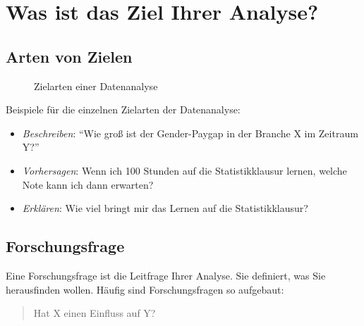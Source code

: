 \documentclass[
  a4paper,
  DIV=11]{scrreprt}
\providecommand{\tightlist}{%
  \setlength{\itemsep}{0pt}\setlength{\parskip}{0pt}}\usepackage{longtable,booktabs,array}
\theoremstyle{definition}
\theoremstyle{definition}
\theoremstyle{definition}
\theoremstyle{remark}
\begin{document}
\section{Was ist das Ziel Ihrer
Analyse?}\label{was-ist-das-ziel-ihrer-analyse}

\subsection{Arten von Zielen}\label{arten-von-zielen}

\begin{figure}


\caption{\label{fig-ziele}Zielarten einer Datenanalyse}

\end{figure}%

Beispiele für die einzelnen Zielarten der Datenanalyse:

\begin{itemize}
\tightlist
\item
  \emph{Beschreiben}: ``Wie groß ist der Gender-Paygap in der Branche X
  im Zeitraum Y?''
\item
  \emph{Vorhersagen}: Wenn ich 100 Stunden auf die Statistikklausur
  lernen, welche Note kann ich dann erwarten?
\item
  \emph{Erklären}: Wie viel bringt mir das Lernen auf die
  Statistikklausur?
\end{itemize}

\subsection{Forschungsfrage}\label{forschungsfrage}

Eine Forschungsfrage ist die Leitfrage Ihrer Analyse. Sie definiert, was
Sie herausfinden wollen. Häufig sind Forschungsfragen so aufgebaut:

\begin{quote}
Hat X einen Einfluss auf Y?
\end{quote}
\end{document}
